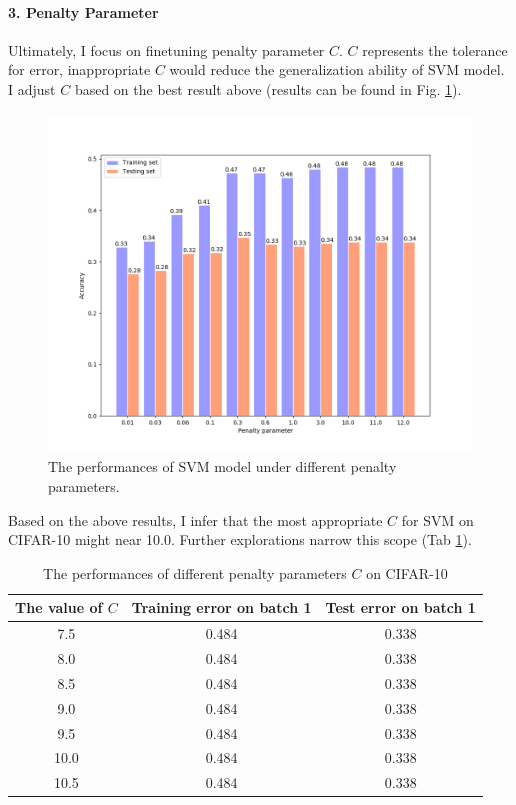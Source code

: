 \documentclass[12pt,a4paper]{article}
\theoremstyle{definition}
\begin{document}
\paragraph{3. Penalty Parameter}

Ultimately, I focus on finetuning penalty parameter $C$. $C$ represents the tolerance for error, inappropriate $C$ would reduce the generalization ability of SVM model. I adjust $C$ based on the best result above (results can be found in Fig. \ref{fig:penalty-para}).

\begin{figure}[H]
	\centering
	\includegraphics[width=0.65\linewidth]{img/para_penalty.png}
	\caption{The performances of SVM model under different penalty parameters.}
	\label{fig:penalty-para}
\end{figure}

Based on the above results, I infer that the most appropriate $C$ for SVM on CIFAR-10 might near 10.0. Further explorations narrow this scope (Tab \ref{tab:penalty-para}).

\vspace{-0.005\linewidth}
\begin{table}[H]
	\renewcommand\arraystretch{1.2}
	\caption{The performances of different penalty parameters $C$ on CIFAR-10}
	\label{tab:penalty-para}
	\centering
	
	\begin{tabular}{c|c|c}
		\centering
		The value of $C$ & Training error on batch 1 & Test error on batch 1 \\
		\hline
		\hline
		
		7.5 & 0.484 & 0.338 \\
		8.0 & 0.484 & 0.338 \\
		8.5 & 0.484 & 0.338 \\
		9.0 & 0.484 & 0.338 \\
		9.5 & 0.484 & 0.338 \\
		10.0 & 0.484 & 0.338 \\
		10.5 & 0.484 & 0.338 \\
	\end{tabular}
\end{table}
\end{document}
